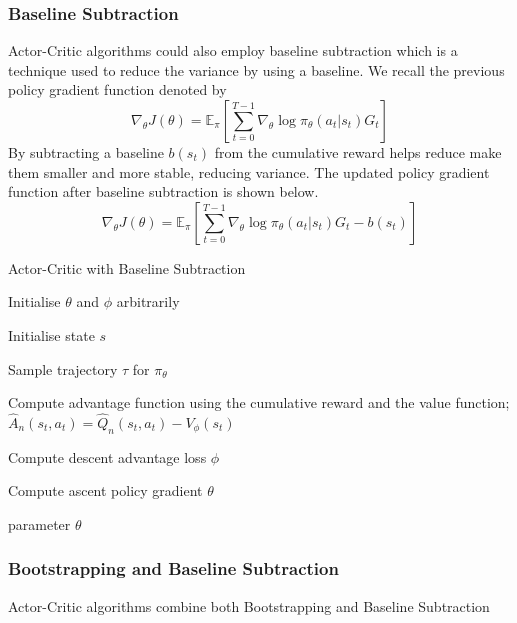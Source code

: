 \documentclass{article}
\begin{document}
\subsubsection{Baseline Subtraction}
Actor-Critic algorithms could also employ baseline subtraction which is a technique used to reduce the variance by using a baseline. We recall the previous policy gradient function denoted by 
\begin{equation*}
\nabla_\theta J(\theta) = \mathbb{E}_\pi[\sum _{t=0}^{T-1}  \nabla_\theta \log\pi_\theta (a_t|s_t)G_t]
\end{equation*}
By subtracting a baseline $b(s_t)$ from the cumulative reward helps reduce make them smaller and more stable, reducing variance. The updated policy gradient function after baseline subtraction is shown below. 
\begin{equation*}
\nabla_\theta J(\theta) = \mathbb{E}_\pi[\sum _{t=0}^{T-1}  \nabla_\theta\log\pi_\theta (a_t|s_t)G_t - b(s_t)]
\end{equation*}
\begin{algorithm}[htbp]
\caption{Actor-Critic with Baseline Subtraction}
\SetAlgoLined
\DontPrintSemicolon
\small %
Initialise $\theta$ and $\phi$ arbitrarily\;\\
{
    Initialise state $s$\;
     \item Sample trajectory $\tau$ for $\pi_\theta$
     \item
    {
     \item Compute advantage function using the cumulative reward and the value function;
     \(\hat{A}_n(s_t,a_t) = \hat{Q}_n(s_t,a_t) - V_\phi(s_t)\)
    }
    \item Compute descent advantage loss $\phi$
    \item Compute ascent policy gradient $\theta$
}
\State \Return parameter $\theta$
\end{algorithm}
\subsubsection{Bootstrapping and Baseline Subtraction}
Actor-Critic algorithms combine both Bootstrapping and Baseline Subtraction
\end{document}
